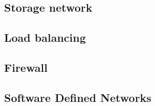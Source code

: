\subsection{Storage network}

\subsection{Load balancing}

\subsection{Firewall}

\subsection{Software Defined Networks}
